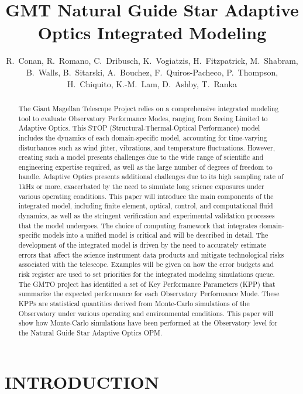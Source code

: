 \documentclass[]{AO4ELT}  %
\title{GMT Natural Guide Star Adaptive Optics Integrated Modeling}
\author[a]{R.~Conan, R.~Romano, C.~Dribusch, K.~Vogiatzis, H.~Fitzpatrick, M.~Shabram, B.~Walls, B.~Sitarski, A.~Bouchez, F.~Quiros-Pacheco, P.~Thompson, H.~Chiquito, K.-M.~Lam, D.~Ashby, T.~Ranka}
\affil[a]{GMTO}
\begin{document}
\maketitle
\begin{abstract}
   The Giant Magellan Telescope Project relies on a comprehensive integrated modeling tool to evaluate Observatory Performance Modes, ranging from Seeing Limited to Adaptive Optics. This STOP (Structural-Thermal-Optical Performance) model includes the dynamics of each domain-specific model, accounting for time-varying disturbances such as wind jitter, vibrations, and temperature fluctuations. However, creating such a model presents challenges due to the wide range of scientific and engineering expertise required, as well as the large number of degrees of freedom to handle. Adaptive Optics presents additional challenges due to its high sampling rate of 1kHz or more, exacerbated by the need to simulate long science exposures under various operating conditions.
   This paper will introduce the main components of the integrated model, including finite element, optical, control, and computational fluid dynamics, as well as the stringent verification and experimental validation processes that the model undergoes. The choice of computing framework that integrates domain-specific models into a unified model is critical and will be described in detail. The development of the integrated model is driven by the need to accurately estimate errors that affect the science instrument data products and mitigate technological risks associated with the telescope. Examples will be given on how the error budgets and risk register are used to set priorities for the integrated modeling simulations queue.
   The GMTO project has identified a set of Key Performance Parameters (KPP) that summarize the expected performance for each Observatory Performance Mode. These KPPs are statistical quantities derived from Monte-Carlo simulations of the Observatory under various operating and environmental conditions. This paper will show how Monte-Carlo simulations have been performed at the Observatory level for the Natural Guide Star Adaptive Optics OPM.
\end{abstract}


\section{INTRODUCTION}
\label{sec:intro}
\end{document}
